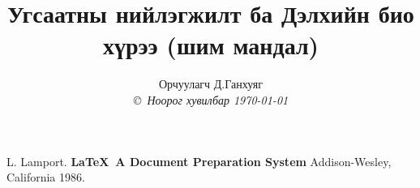 \documentclass[12pt,paper=a4,leqno]{book}
\title{Угсаатны нийлэгжилт ба Дэлхийн био хүрээ (шим мандал) }
\author{Орчуулагч Д.Ганхуяг  \\
{\small\em \copyright \  Ноорог хувилбар \today }}
\date{ }
\begin{document}
\maketitle
\tableofcontents
\listoffigures



\pagestyle{headings}





\begin{thebibliography}{99}
 L. Lamport. {\bf \LaTeX \ A Document Preparation System}
Addison-Wesley, California 1986.
\end{thebibliography}


\end{document}
